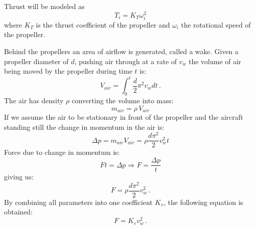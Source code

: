 Thrust will be modeled as
\begin{equation}
    T_i = K_T \omega_i^2
\end{equation}
where $K_T$ is the thrust coefficient of the propeller and $\omega_i$ the rotational speed of the propeller.

Behind the propellers an area of airflow is generated, called a wake.
Given a propeller diameter of $d$, pushing air through at a rate of $v_w$ the volume of air being moved by the propeller during time $t$ is:
\begin{equation}
	V_{air} = \int_0^t \frac{d}{2} \pi^2 v_w dt \,.
\end{equation}
The air has density $\rho$ converting the volume into mass:
\begin{equation}
	m_{air} = \rho \, V_{air}
\end{equation}
If we assume the air to be stationary in front of the propeller and the aircraft standing still the change in momentum in the air is:
\begin{equation}
	\Delta p = m_{air} V_{air} = \rho \frac{d \pi^2}{2} v_w^2 t
\end{equation}
Force due to change in momentum is:
\begin{equation}
	F t = \Delta p \Rightarrow F = \frac{\Delta p}{t}
\end{equation}
giving us:
\begin{equation}
	F = \rho  \frac{d \pi^2}{2} v_w^2 \, .
\end{equation}
By combining all parameters into one coefficient $K_v$, the following equation is obtained:
\begin{equation}
	F = K_v  v_w^2 \, .
	\label{propliftvel}
\end{equation}

